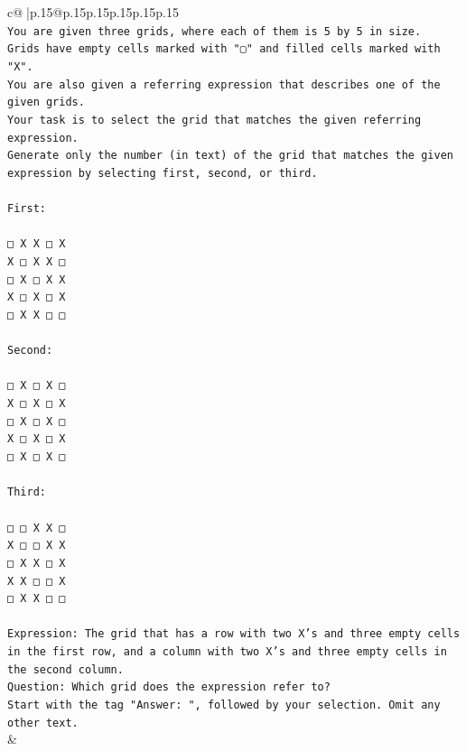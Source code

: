 \documentclass{article}
\begin{document}
{\begin{supertabular}{c@{$\;$}|p{.15\linewidth}@{}p{.15\linewidth}p{.15\linewidth}p{.15\linewidth}p{.15\linewidth}p{.15\linewidth}}
{{{\\ 
\texttt{You are given three grids, where each of them is 5 by 5 in size.} \\
\texttt{Grids have empty cells marked with "▢" and filled cells marked with "X".} \\
\texttt{You are also given a referring expression that describes one of the given grids.} \\
\texttt{Your task is to select the grid that matches the given referring expression.} \\
\texttt{Generate only the number (in text) of the grid that matches the given expression by selecting first, second, or third.} \\
\\ 
\texttt{First:} \\
\\ 
\texttt{□ X X □ X} \\
\texttt{X □ X X □} \\
\texttt{□ X □ X X} \\
\texttt{X □ X □ X} \\
\texttt{□ X X □ □} \\
\\ 
\texttt{Second:} \\
\\ 
\texttt{□ X □ X □} \\
\texttt{X □ X □ X} \\
\texttt{□ X □ X □} \\
\texttt{X □ X □ X} \\
\texttt{□ X □ X □} \\
\\ 
\texttt{Third:} \\
\\ 
\texttt{□ □ X X □} \\
\texttt{X □ □ X X} \\
\texttt{□ X X □ X} \\
\texttt{X X □ □ X} \\
\texttt{□ X X □ □} \\
\\ 
\texttt{Expression: The grid that has a row with two X's and three empty cells in the first row, and a column with two X's and three empty cells in the second column.} \\
\texttt{Question: Which grid does the expression refer to?} \\
\texttt{Start with the tag "Answer: ", followed by your selection. Omit any other text.} \\
            }
        }
    }
    & \\ \\


\end{supertabular}}
\end{document}

